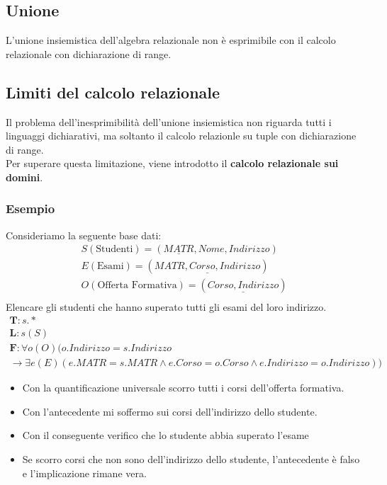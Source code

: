 \subsection{Unione}
L'unione insiemistica dell'algebra relazionale non è esprimibile con il calcolo relazionale con dichiarazione di range.

\subsection{Limiti del calcolo relazionale}
Il problema dell'inesprimibilità dell'unione insiemistica non riguarda tutti i linguaggi dichiarativi, ma soltanto il calcolo relazionle su tuple con dichiarazione di range.\\
Per superare questa limitazione, viene introdotto il \textbf{calcolo relazionale sui domini}.

\subsubsection{Esempio}
Consideriamo la seguente base dati:
    \begin{equation}\begin{aligned}
        S (\text{Studenti}) = (\underline{MATR}, Nome, Indirizzo)\\
        E (\text{Esami}) = (\underline{MATR, Corso, Indirizzo})\\
        O (\text{Offerta Formativa}) = (\underline{Corso, Indirizzo})\\
    \end{aligned}\end{equation}
Elencare gli studenti che hanno superato tutti gli esami del loro indirizzo.
    \begin{equation}\begin{aligned}
        \textbf{T}: s.*\\
        \textbf{L}: s(S)\\
        \textbf{F}: \forall o(O) (o.Indirizzo = s.Indirizzo \\
        \rightarrow \exists e(E) (e.MATR = s.MATR \wedge e.Corso = o.Corso \wedge e.Indirizzo = o.Indirizzo))
    \end{aligned}\end{equation}
    \begin{itemize}
        \item{Con la quantificazione universale scorro tutti i corsi dell'offerta formativa.}
        \item{Con l'antecedente mi soffermo sui corsi dell'indirizzo dello studente.}
        \item{Con il conseguente verifico che lo studente abbia superato l'esame}
        \item{Se scorro corsi che non sono dell'indirizzo dello studente, l'antecedente è falso e l'implicazione rimane vera.}
    \end{itemize}

